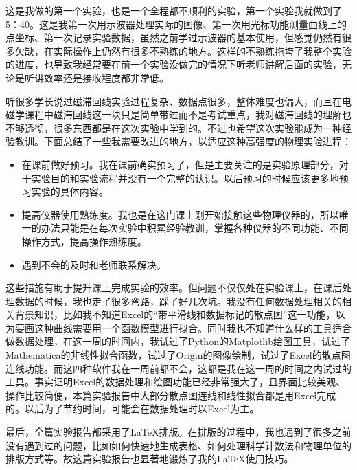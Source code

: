 \documentclass[12pt]{article}
\begin{document}
这是我做的第一个实验，也是一个全程都不顺利的实验，第一个实验我就做到了5：40。这是我第一次用示波器处理实际的图像、第一次用光标功能测量曲线上的点坐标、第一次记录实验数据，虽然之前学过示波器的基本使用，但感觉仍然有很多欠缺，在实际操作上仍然有很多不熟练的地方。这样的不熟练拖垮了我整个实验的进度，也导致我经常要在前一个实验没做完的情况下听老师讲解后面的实验，无论是听讲效率还是接收程度都非常低。

听很多学长说过磁滞回线实验过程复杂、数据点很多，整体难度也偏大，而且在电磁学课程中磁滞回线这一块只是简单带过而不是考试重点，我对磁滞回线的理解也不够透彻，很多东西都是在这次实验中学到的。不过也希望这次实验能成为一种经验教训。下面总结了一些我需要改进的地方，以适应这种高强度的物理实验进程：

\begin{itemize}
    \item 在课前做好预习。我在课前确实预习了，但是主要关注的是实验原理部分，对于实验目的和实验流程并没有一个完整的认识。以后预习的时候应该更多地预习实验的具体内容。
    \item 提高仪器使用熟练度。我也是在这门课上刚开始接触这些物理仪器的，所以唯一的办法只能是在每次实验中积累经验教训，掌握各种仪器的不同功能、不同操作方式，提高操作熟练度。
    \item 遇到不会的及时和老师联系解决。
\end{itemize}

这些措施有助于提升课上完成实验的效率。但问题不仅仅处在实验课上，在课后处理数据的时候，我也走了很多弯路，踩了好几次坑。我没有任何数据处理相关的相关背景知识，比如我不知道Excel的“带平滑线和数据标记的散点图”这一功能，以为要画这种曲线需要用一个函数模型进行拟合。同时我也不知道什么样的工具适合做数据处理，在这一周的时间内，我试过了Python的Matplotlib绘图工具，试过了Mathematica的非线性拟合函数，试过了Origin的图像绘制，试过了Excel的散点图连线功能。而这四种软件我在一周前都不会，这都是我在这一周的时间之内试过的工具。事实证明Excel的数据处理和绘图功能已经非常强大了，且界面比较美观、操作比较简便，本篇实验报告中大部分散点图连线和线性拟合都是用Excel完成的。以后为了节约时间，可能会在数据处理时以Excel为主。

最后，全篇实验报告都采用了\LaTeX{}排版。在排版的过程中，我也遇到了很多之前没有遇到过的问题，比如如何快速地生成表格、如何处理科学计数法和物理单位的排版方式等。故这篇实验报告也显著地锻炼了我的\LaTeX{}使用技巧。
\end{document}
